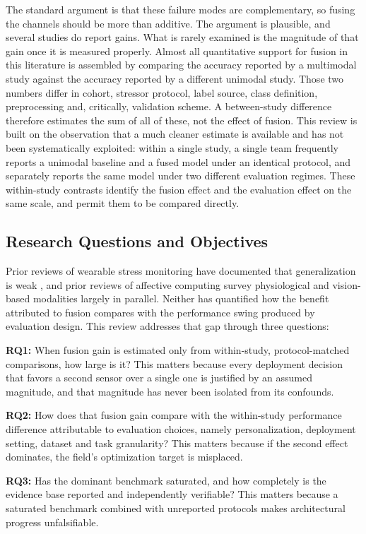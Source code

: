 \documentclass[11pt,a4paper]{article}
\begin{document}
The standard argument is that these failure modes are complementary, so fusing the channels
should be more than additive. The argument is plausible, and several studies do report gains.
What is rarely examined is the magnitude of that gain once it is measured properly. Almost
all quantitative support for fusion in this literature is assembled by comparing the accuracy
reported by a multimodal study against the accuracy reported by a different unimodal study.
Those two numbers differ in cohort, stressor protocol, label source, class definition,
preprocessing and, critically, validation scheme. A between-study difference therefore
estimates the sum of all of these, not the effect of fusion. This review is built on the
observation that a much cleaner estimate is available and has not been systematically
exploited: within a single study, a single team frequently reports a unimodal baseline and a
fused model under an identical protocol, and separately reports the same model under two
different evaluation regimes. These within-study contrasts identify the fusion effect and the
evaluation effect on the same scale, and permit them to be compared directly.

\subsection{Research Questions and Objectives}
Prior reviews of wearable stress monitoring have documented that generalization is weak
\cite{r118}, and prior reviews of affective computing survey physiological and vision-based
modalities largely in parallel. Neither has quantified how the benefit attributed to fusion
compares with the performance swing produced by evaluation design. This review addresses that
gap through three questions:

\textbf{RQ1:} When fusion gain is estimated only from within-study, protocol-matched
comparisons, how large is it? This matters because every deployment decision that favors a
second sensor over a single one is justified by an assumed magnitude, and that magnitude has
never been isolated from its confounds.

\textbf{RQ2:} How does that fusion gain compare with the within-study performance difference
attributable to evaluation choices, namely personalization, deployment setting, dataset and
task granularity? This matters because if the second effect dominates, the field's
optimization target is misplaced.

\textbf{RQ3:} Has the dominant benchmark saturated, and how completely is the evidence base
reported and independently verifiable? This matters because a saturated benchmark combined
with unreported protocols makes architectural progress unfalsifiable.
\end{document}
